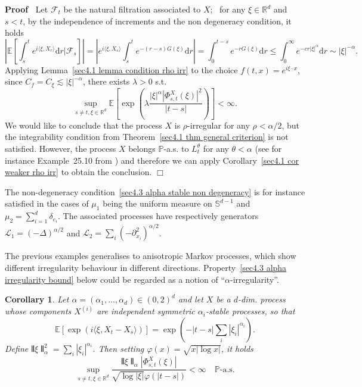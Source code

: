 \documentclass[10pt]{article}
\newcommand{\mathd}{\mathrm{d}}
\newcommand{\nobracket}{}
\newenvironment{proof}{\noindent\textbf{Proof\ }}{\hspace*{\fill}$\Box$\medskip}
\newtheorem{corollary}[theorem]{Corollary}
\begin{document}
\begin{proof}
  Let $\mathcal{F}_t$ be the natural filtration associated to $X$; \ for any
  $\xi \in \mathbb{R}^d$ and $s < t$, by the independence of increments and
  the non degeneracy condition, it holds
  \[ \left| \mathbb{E} \left[ \int_s^t e^{i \langle \xi, X_r \rangle} \mathd r
     | \mathcal{F}_s \nobracket \right] \right| = \left| e^{i \langle \xi, X_s
     \rangle} \int_s^t e^{- (r - s) G (\xi)} \mathd r \right| = \int_0^{t - s}
     e^{- r G (\xi)} \mathd r \leqslant \int_0^{\infty} e^{- c r | \xi
     |^{\alpha}} \mathd r \sim | \xi |^{- \alpha} . \]
  Applying Lemma~\ref{sec4.1 lemma condition rho irr} to the choice $f (t, x)
  = e^{i \xi \cdot x}$, since $C_f = C_{\xi} \lesssim | \xi |^{- \alpha}$,
  there exists $\lambda > 0$ s.t.
  \[ \sup_{s \neq t, \xi \in \mathbb{R}^d} \mathbb{E} \left[ \exp \left(
     \lambda \frac{| \xi |^{\alpha}  | \Phi_{s, t}^X (\xi) |^2}{| t - s |}
     \right) \right] < \infty . \]
  We would like to conclude that the process $X$ is $\rho$-irregular for any
  $\rho < \alpha / 2$, but the integrability condition from
  Theorem~\ref{sec4.1 thm general criterion} is not satisfied. However, the
  process $X$ belongs $\mathbb{P}$-a.s. to $L^{\theta}_t$ for any $\theta <
  \alpha$ (see for instance Example~25.10 from {\cite{sato}}) and therefore we
  can apply Corollary~\ref{sec4.1 cor weaker rho irr} to obtain the
  conclusion.
\end{proof}

\begin{remark}
  The non\mbox{-}degeneracy condition~{\eqref{sec4.3 alpha stable non
  degeneracy}} is for instance satisfied in the cases of $\mu_1$ being the
  uniform measure on $\mathbb{S}^{d - 1}$ and $\mu_2 = \sum_{i = 1}^d
  \delta_{e_i}$. The associated processes have respectively generators
  $\mathcal{L}_1 = (- \Delta)^{\alpha / 2}$ and $\mathcal{L}_2 = \sum_i (-
  \partial_{x_i}^2)^{\alpha / 2}$.
\end{remark}

The previous examples generalises to anisotropic Markov processes, which show
different irregularity behaviour in different directions.
Property~{\eqref{sec4.3 alpha irregularity bound}} below could be regarded as
a notion of ``$\alpha$\mbox{-}irregularity''.

\begin{corollary}
  Let $\alpha = (\alpha_1, \ldots, \alpha_d) \in (0, 2)^d$ and let $X$ be a
  $d$\mbox{-}dim. process whose components $X^{(i)}$ are independent symmetric
  $\alpha_i$-stable processes, so that
  \[ \mathbb{E} [\exp (i \langle \xi, X_t - X_s \rangle)] = \exp \left( - | t
     - s | \sum_i | \xi_i |^{\alpha_i} \right) . \]
  Define $\interleave \xi \interleave^2_{\alpha} = \sum_i | \xi_i
  |^{\alpha_i}$. Then setting $\varphi (x) = \sqrt{x | \log x |}$, it holds
  \begin{equation}
    \sup_{s \neq t, \xi \in \mathbb{R}^d} \frac{\interleave \xi
    \interleave_{\alpha} | \Phi^X_{s, t} (\xi) |}{\sqrt{\log | \xi |} \varphi
    (| t - s |)} < \infty \quad \mathbb{P} \text{-a.s.} \label{sec4.3 alpha
    irregularity bound}
  \end{equation}
\end{corollary}
\end{document}
